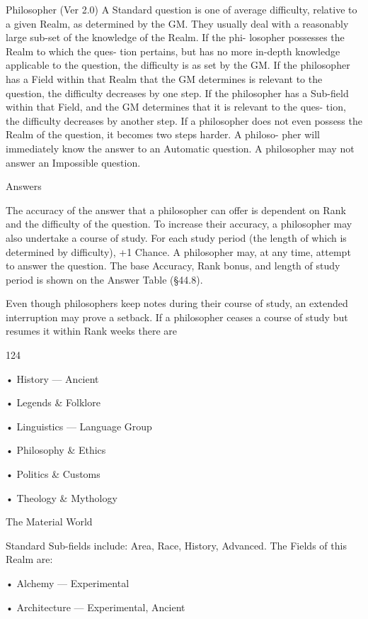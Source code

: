 \begin{Chapter}{Philosopher (Ver 2.0)}
A  Standard  question  is  one  of  average  difficulty, 
relative  to  a  given  Realm,  as  determined  by  the 
GM.  They  usually  deal  with  a  reasonably  large 
sub-set of the knowledge of the Realm.  If the phi-
losopher  possesses  the  Realm  to  which  the  ques-
tion pertains, but has no more in-depth knowledge 
applicable to the question, the difficulty is as set by 
the  GM.  If  the  philosopher  has  a  Field  within  that 
Realm  that  the  GM  determines  is  relevant  to  the 
question, the difficulty decreases by one step. If the 
philosopher  has  a  Sub-field  within  that  Field,  and 
the  GM  determines  that  it  is  relevant  to  the  ques-
tion,  the  difficulty  decreases  by  another  step.  If  a 
philosopher does not even possess the Realm of the 
question,  it  becomes  two  steps  harder.  A  philoso-
pher  will  immediately  know  the  answer  to  an 
Automatic question. A philosopher may not answer 
an Impossible question. 

Answers 

The accuracy of the answer that a philosopher can 
offer is dependent on Rank and the difficulty of the 
question. To increase their accuracy, a philosopher 
may  also  undertake  a  course  of  study.  For  each 
study period (the length of which is determined by 
difficulty), +1%
Chance. A philosopher may, at any time, attempt to 
answer  the  question.  The  base  Accuracy,  Rank 
bonus, and length of study period is  shown on the 
Answer Table (§44.8). 

Even  though  philosophers  keep  notes  during  their 
course  of  study,  an  extended  interruption  may 
prove a setback. If a philosopher ceases a course of 
study  but  resumes  it  within  Rank  weeks  there  are 

124 

• History — Ancient  

• Legends \& Folklore  

• Linguistics — Language Group  

• Philosophy \& Ethics  

• Politics \& Customs  

• Theology \& Mythology 

The Material World 

Standard  Sub-fields  include:  Area,  Race,  History, 
Advanced. The Fields of this Realm are:  

• Alchemy — Experimental  

• Architecture — Experimental, Ancient  


\end{Chapter}
